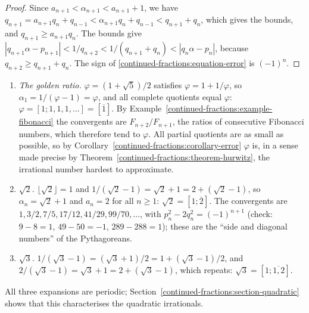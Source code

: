 \begin{proof}
Since $a_{n+1} < \alpha_{n+1} < a_{n+1} + 1$, we have $q_{n+1} = a_{n+1}q_n + q_{n-1} < \alpha_{n+1}q_n + q_{n-1} < q_{n+1} + q_n$, which gives the bounds, and $q_{n+1} \geq a_{n+1}q_n$. The bounds
give $|q_{n+1}\alpha - p_{n+1}| < 1/q_{n+2} < 1/(q_{n+1} + q_n) < |q_n\alpha - p_n|$, because $q_{n+2} \geq q_{n+1} + q_n$. The sign of \eqref{continued-fractions:equation-error} is $(-1)^n$.
\end{proof}

\begin{example}\label{continued-fractions:example-quadratic-expansions}
\begin{enumerate}
\item \emph{The golden ratio.} $\varphi = (1 + \sqrt5)/2$ satisfies $\varphi = 1 + 1/\varphi$, so $\alpha_1 = 1/(\varphi - 1) = \varphi$, and all complete quotients equal $\varphi$:
$\varphi = [1; 1, 1, 1, \ldots] = [\overline{1}]$. By Example~\ref{continued-fractions:example-fibonacci} the convergents are $F_{n+2}/F_{n+1}$, the ratios of consecutive Fibonacci numbers, which
therefore tend to $\varphi$. All partial quotients are as small as possible, so by Corollary~\ref{continued-fractions:corollary-error} $\varphi$ is, in a sense made precise by
Theorem~\ref{continued-fractions:theorem-hurwitz}, the irrational number hardest to approximate.
\item \emph{$\sqrt2$.} $\lfloor \sqrt2 \rfloor = 1$ and $1/(\sqrt2 - 1) = \sqrt2 + 1 = 2 + (\sqrt2 - 1)$, so $\alpha_n = \sqrt2 + 1$ and $a_n = 2$ for all $n \geq 1$: $\sqrt2 = [1; \overline{2}]$.
The convergents are $1, 3/2, 7/5, 17/12, 41/29, 99/70, \ldots$, with $p_n^2 - 2q_n^2 = (-1)^{n+1}$ (check: $9 - 8 = 1$, $49 - 50 = -1$, $289 - 288 = 1$); these are the ``side and diagonal numbers''
of the Pythagoreans.
\item \emph{$\sqrt3$.} $1/(\sqrt3 - 1) = (\sqrt3 + 1)/2 = 1 + (\sqrt3 - 1)/2$, and $2/(\sqrt3 - 1) = \sqrt3 + 1 = 2 + (\sqrt3 - 1)$, which repeats: $\sqrt3 = [1; \overline{1, 2}]$.
\end{enumerate}
All three expansions are periodic; Section~\ref{continued-fractions:section-quadratic} shows that this characterises the quadratic irrationals.
\end{example}

